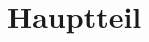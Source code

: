 \section{Hauptteil}
\lipsum[1-8]

\cite{muellermueller2024reinforcement}
\cite{schmidt2023einfuhrung}